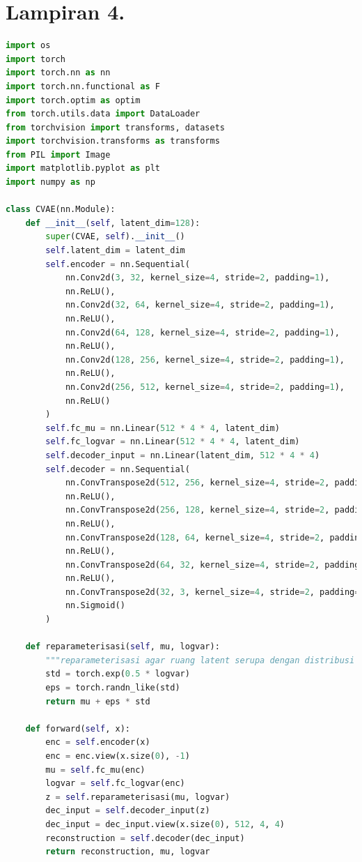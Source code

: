 \section*{Lampiran 4. }
\label{Lampiran 4}
\begin{lstlisting}[language=Python]
import os
import torch
import torch.nn as nn
import torch.nn.functional as F
import torch.optim as optim
from torch.utils.data import DataLoader
from torchvision import transforms, datasets
import torchvision.transforms as transforms
from PIL import Image
import matplotlib.pyplot as plt
import numpy as np

class CVAE(nn.Module):
    def __init__(self, latent_dim=128):
        super(CVAE, self).__init__()
        self.latent_dim = latent_dim
        self.encoder = nn.Sequential(
            nn.Conv2d(3, 32, kernel_size=4, stride=2, padding=1),
            nn.ReLU(),
            nn.Conv2d(32, 64, kernel_size=4, stride=2, padding=1),
            nn.ReLU(),
            nn.Conv2d(64, 128, kernel_size=4, stride=2, padding=1),
            nn.ReLU(),
            nn.Conv2d(128, 256, kernel_size=4, stride=2, padding=1),
            nn.ReLU(),
            nn.Conv2d(256, 512, kernel_size=4, stride=2, padding=1),
            nn.ReLU()
        )
        self.fc_mu = nn.Linear(512 * 4 * 4, latent_dim)
        self.fc_logvar = nn.Linear(512 * 4 * 4, latent_dim)
        self.decoder_input = nn.Linear(latent_dim, 512 * 4 * 4)
        self.decoder = nn.Sequential(
            nn.ConvTranspose2d(512, 256, kernel_size=4, stride=2, padding=1),
            nn.ReLU(),
            nn.ConvTranspose2d(256, 128, kernel_size=4, stride=2, padding=1),
            nn.ReLU(),
            nn.ConvTranspose2d(128, 64, kernel_size=4, stride=2, padding=1),
            nn.ReLU(),
            nn.ConvTranspose2d(64, 32, kernel_size=4, stride=2, padding=1),
            nn.ReLU(),
            nn.ConvTranspose2d(32, 3, kernel_size=4, stride=2, padding=1),
            nn.Sigmoid()
        )

    def reparameterisasi(self, mu, logvar):
        """reparameterisasi agar ruang latent serupa dengan distribusi gaussian."""
        std = torch.exp(0.5 * logvar)
        eps = torch.randn_like(std)
        return mu + eps * std

    def forward(self, x):
        enc = self.encoder(x)
        enc = enc.view(x.size(0), -1)
        mu = self.fc_mu(enc)
        logvar = self.fc_logvar(enc)
        z = self.reparameterisasi(mu, logvar)
        dec_input = self.decoder_input(z)
        dec_input = dec_input.view(x.size(0), 512, 4, 4)
        reconstruction = self.decoder(dec_input)
        return reconstruction, mu, logvar


\end{lstlisting}
